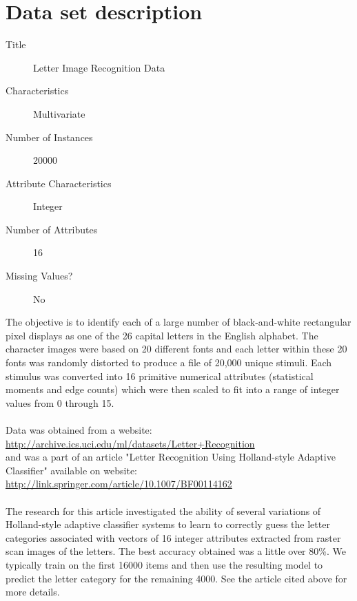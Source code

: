 \chapter*{Data set description}
\begin{description}
\item[Title] Letter Image Recognition Data
\item[Characteristics]  Multivariate
\item[Number of Instances] 20000
\item[Attribute Characteristics] Integer
\item[Number of Attributes] 16
\item[Missing Values?] No
\end{description}

The objective is to identify each of a large number of black-and-white rectangular pixel displays as one of the 26 capital letters in the English alphabet. The character images were based on 20 different fonts and each letter within these 20 fonts was randomly distorted to produce a file of 20,000 unique stimuli. Each stimulus was converted into 16 primitive numerical attributes (statistical moments and edge counts) which were then scaled to fit into a range of integer values from 0 through 15. \\
\\
\noindent
Data was obtained from a website: \\
\url{http://archive.ics.uci.edu/ml/datasets/Letter+Recognition} \\
and was a part of an article "Letter Recognition Using Holland-style Adaptive Classifier" available on website: \\
\url{http://link.springer.com/article/10.1007/BF00114162} \\
\\
\noindent
The research for this article investigated the ability of several
variations of Holland-style adaptive classifier systems to learn to
correctly guess the letter categories associated with vectors of 16
integer attributes extracted from raster scan images of the letters.
The best accuracy obtained was a little over 80\%.
We typically train on the first 16000 items and then use the resulting model to predict the letter category for the remaining 4000. See the article cited above for more details.

